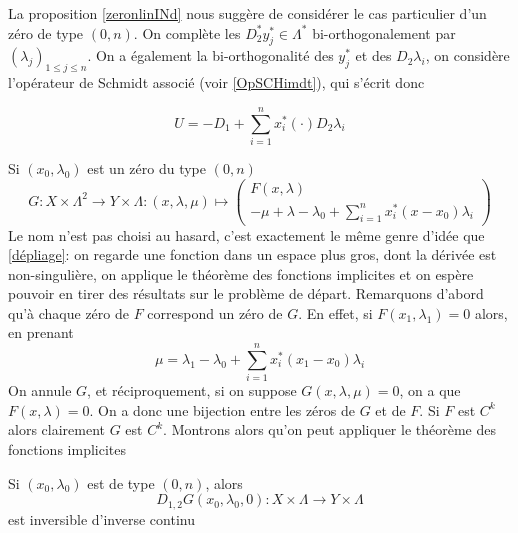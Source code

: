 \documentclass[memoire.tex]{subfiles}
\begin{document}
La proposition \ref{zeronlinINd} nous suggère de considérer le cas particulier d'un zéro de type $(0,n)$. On complète les $D_2^{*}y_j^{*}\in \Lambda^{*}$ bi-orthogonalement par $(\lambda_j)_{1\leq j\leq n}$. On a également la bi-orthogonalité des $y^{*}_j$ et des $D_2\lambda_i$, on considère l'opérateur de Schmidt associé (voir \eqref{OpSCHimdt}), qui s'écrit donc

\begin{equation}\label{SCHMIdTopreminder}
    U=-D_1+ \sum_{i=1}^n x_i^{*}(\cdot) D_2 \lambda_i
\end{equation}

Si $(x_0,\lambda_0)$ est un zéro du type $(0,n)$
\begin{equation*}
    G: X\times\Lambda^2\rightarrow Y\times\Lambda : (x,\lambda,\mu) \mapsto 
    \begin{pmatrix}
        F(x,\lambda) \\
        -\mu +\lambda-\lambda_0 + \sum_{i=1}^n x_i^{*}(x-x_0)\lambda_i
    \end{pmatrix}
\end{equation*}
Le nom n'est pas choisi au hasard, c'est exactement le même genre d'idée que \ref{dépliage}: on regarde une fonction dans un espace plus gros, dont la dérivée est non-singulière, on applique le théorème des fonctions implicites et on espère pouvoir en tirer des résultats sur le problème de départ.
Remarquons d'abord qu'à chaque zéro de $F$ correspond un zéro de $G$. En effet, si $F(x_1,\lambda_1)=0$ alors, en prenant 
\begin{equation*}
    \mu =\lambda_1-\lambda_0 + \sum_{i=1}^n x_i^{*}(x_1-x_0)\lambda_i
\end{equation*}
On annule $G$, et réciproquement, si on suppose $G(x,\lambda,\mu)=0$, on  a que $F(x,\lambda)=0$. On a donc une bijection entre les zéros de $G$ et de $F$. Si $F$ est $C^k$ alors clairement $G$ est $C^k$. Montrons alors qu'on peut appliquer le théorème des fonctions implicites
\begin{lemme}
    Si $(x_0,\lambda_0)$ est de type $(0,n)$, alors 
    \begin{equation*}
        D_{1,2} G(x_0,\lambda_0,0) :  X\times\Lambda\rightarrow Y\times \Lambda
    \end{equation*}
    est inversible d'inverse continu
\end{lemme}
\end{document}
